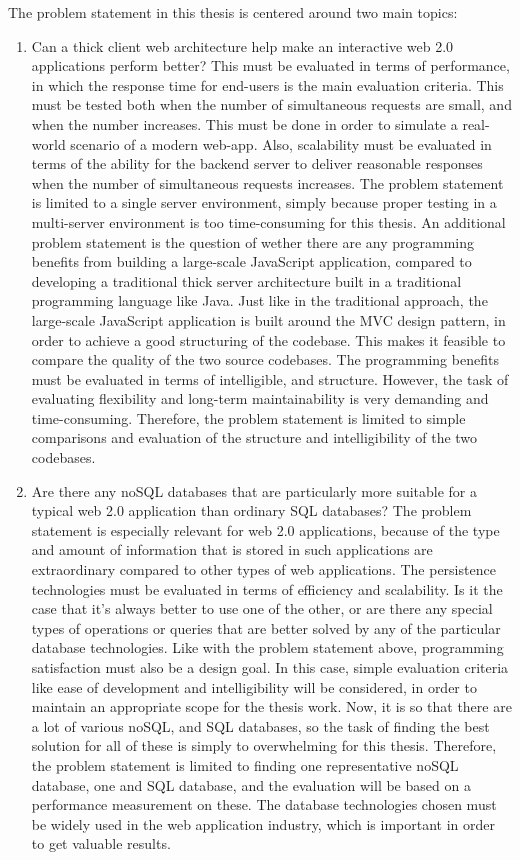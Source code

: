 The problem statement in this thesis is centered around two main topics:

\begin {enumerate}
\item Can a thick client web architecture help make an interactive web 2.0 applications perform better? This must be evaluated in terms of performance, in which the response time for end-users is the main evaluation criteria. This must be tested both when the number of simultaneous requests are small, and when the number increases. This must be done in order to simulate a real-world scenario of a modern web-app. Also, scalability must be evaluated in terms of the ability for the backend server to deliver reasonable responses when the number of simultaneous requests increases.  The problem statement is limited to a single server environment, simply because proper testing in a multi-server environment is too time-consuming for this thesis. 
          An additional problem statement is the question of wether there are any programming benefits from building a large-scale JavaScript application, compared to developing a traditional thick server architecture built in a traditional programming language like Java. Just like in the traditional approach, the large-scale JavaScript application is built around the MVC design pattern, in order to achieve a good structuring of the codebase. This makes it  feasible to compare the quality of the two source codebases. The programming benefits must be evaluated in terms of intelligible, and structure. However, the task of evaluating flexibility and long-term maintainability is very demanding and time-consuming. Therefore, the problem statement is limited to simple comparisons and evaluation of the structure and intelligibility of the two codebases.  
 
\item	Are there any noSQL databases that are particularly more suitable for a typical web 2.0 application than ordinary SQL databases? The problem statement is especially relevant for web 2.0 applications, because of the type and amount of information that is stored in such applications are extraordinary compared to other types of web applications. The persistence technologies must be evaluated in terms of efficiency and scalability. Is it the case that it's always better to use one of the other, or are there any special types of operations or queries that are better solved by any of the particular database technologies. Like with the problem statement above, programming satisfaction must also be a design goal. In this case, simple evaluation criteria like ease of development and intelligibility will be considered, in order to maintain an appropriate scope for the thesis work. Now, it is so that there are a lot of various noSQL, and SQL databases, so the task of finding the best solution for all of these is simply to overwhelming for this thesis. Therefore, the problem statement is limited to finding one representative noSQL database, one and SQL database, and the evaluation will be based on a performance measurement on these. The database technologies chosen must be widely used in the web application industry, which is important in order to get valuable results.   
\end{enumerate}
	
